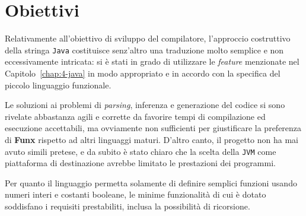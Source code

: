\section{Obiettivi}
\label{sec:6-1-objectives}

Relativamente all'obiettivo di sviluppo del compilatore, l'approccio costruttivo della stringa \texttt{Java}
costituisce senz'altro una traduzione molto semplice e non eccessivamente intricata:
si è stati in grado di utilizzare le \textit{feature} menzionate nel Capitolo~\ref{chap:4-java} in modo
appropriato e in accordo con la specifica del piccolo linguaggio funzionale.


Le soluzioni ai problemi di \textit{parsing}, inferenza e generazione del codice si sono rivelate abbastanza
agili e corrette da favorire tempi di compilazione ed esecuzione accettabili, ma ovviamente non sufficienti
per giustificare la preferenza di \textbf{Funx} rispetto ad altri linguaggi maturi.
D'altro canto, il progetto non ha mai avuto simili pretese, e da subito è stato chiaro che la scelta della \texttt{JVM}
come piattaforma di destinazione avrebbe limitato le prestazioni dei programmi.


Per quanto il linguaggio permetta solamente di definire semplici funzioni usando numeri interi e costanti booleane,
le minime funzionalità di cui è dotato soddisfano i requisiti prestabiliti, inclusa la possibilità di ricorsione. 